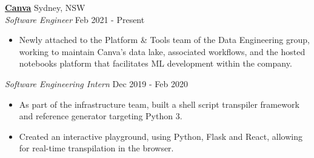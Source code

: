 \documentclass[a4paper]{article}
\newenvironment{myitemize}
{   \small
    \vspace{-2pt}
    \begin{itemize}
    \setlength{\itemsep}{0pt}
    \setlength{\parskip}{0pt}
    \setlength{\parsep}{0pt}     }
{ \end{itemize}                  }
\begin{document}
\textbf{\href{https://www.canva.com/}{Canva}} \hfill Sydney, NSW\\
\textit{Software Engineer} \hfill Feb 2021 - Present\\
\begin{myitemize} \itemsep 0.5mm
	\item Newly attached to the Platform \& Tools team of the Data Engineering group, working to maintain Canva's data lake, associated workflows, and the hosted notebooks platform that facilitates ML development within the company.
\end{myitemize}
\vspace{-1mm}
\textit{Software Engineering Intern} \hfill Dec 2019 - Feb 2020\\
\begin{myitemize} \itemsep 0.5mm
	\item As part of the infrastructure team, built a shell script transpiler framework and reference generator targeting Python 3.
	\item Created an interactive playground, using Python, Flask and React, allowing for real-time transpilation in the browser.
\end{myitemize}

\end{document}
